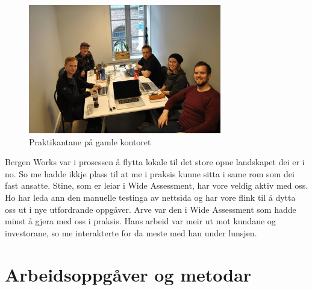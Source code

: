\documentclass[12pt]{article}
\begin{document}
\begin{figure}[!h]
  \includegraphics[width=0.75\textwidth]{Studenter}
  \centering
  \caption{Praktikantane på gamle kontoret}
  \label{fig:praktikantar1}
\end{figure}

Bergen Works var i prosessen å flytta lokale
til det store opne landskapet dei er i no. So me hadde ikkje plass til at me i
praksis kunne sitta i same rom som dei fast ansatte.
Stine, som er leiar i Wide Assessment, har vore veldig aktiv med oss. Ho har leda
ann den manuelle testinga av nettsida og har vore flink til å dytta oss ut i nye
utfordrande oppgåver. Arve var den i Wide Assessment som hadde minst å gjera med
oss i praksis. Hans arbeid var meir ut mot kundane og investorane, so me interakterte
for da meste med han under lunsjen.

\section{Arbeidsoppgåver og metodar}
\end{document}
